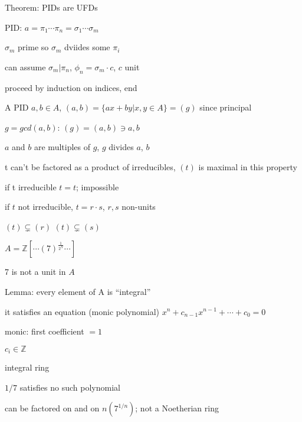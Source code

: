 \documentclass[12pt]{article}
\begin{document}
\noindent
Theorem: PIDs are UFDs

PID: $a = \pi_1 \cdots \pi_n = \sigma_1 \cdots \sigma_m$

$\sigma_m$ prime so $\sigma_m$ dviides some $\pi_i$

can assume $\sigma_m | \pi_n$, $\phi_n = \sigma_m \cdot c$, $c$ unit

proceed by induction on indices, end

\noindent
A PID $a, b \in A$, $(a, b) = \{ax + by | x, y \in A\} = (g)$ since principal

$g = gcd(a, b)$: $(g) = (a, b) \ni a, b$

$a$ and $b$ are multiples of $g$, $g$ divides $a$, $b$

\noindent
t can't be factored as a product of irreducibles, $(t)$ is maximal in this property

\noindent
if t irreducible $t = t$; impossible

if $t$ not irreducible, $t = r \cdot s$, $r, s$ non-units

$(t) \subsetneq (r)$ $(t) \subsetneq (s)$

\noindent
$A = \mathds{Z}[\cdots (7)^{\frac{1}{2^N}} \cdots]$

7 is not a unit in $A$

\noindent
Lemma: every element of A is ``integral''

it satisfies an equation (monic polynomial) $x^n + c_{n-1}x^{n-1} + \cdots + c_0 = 0$

monic: first coefficient $= 1$

$c_i \in \mathds{Z}$

integral ring

\noindent
$1/7$ satisfies no such polynomial

 can be factored on and on $n(7^{1/n})$; not a Noetherian ring
\end{document}
